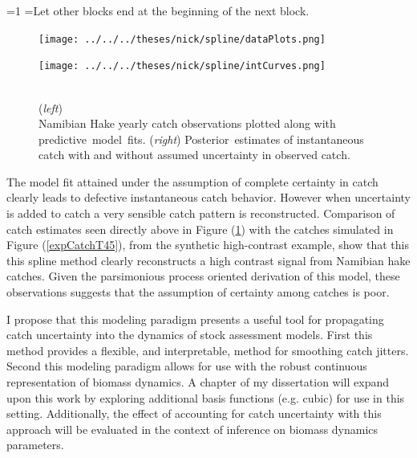 \documentclass[12pt]{article}
\newcounter{alphasect}
\def\alphainsection{0}
\newenvironment{alphasection}{%
  \ifnum\alphainsection=1%
    \errhelp={Let other blocks end at the beginning of the next block.}
    \errmessage{Nested Alpha section not allowed}
  \fi%
  \setcounter{alphasect}{0}
  \def\alphainsection{1}
}{%
  \setcounter{alphasect}{0}
  \def\alphainsection{0}
}%
\begin{document}
\begin{alphasection}
%
\clearpage
\begin{figure}[h!]
\begin{minipage}[h!]{0.36\textwidth}
%
\hspace{-1cm}
\texttt{[image: ../../../theses/nick/spline/dataPlots.png]}%
\end{minipage}
\begin{minipage}[h!]{0.36\textwidth}
\hspace{-0.5cm}
\texttt{[image: ../../../theses/nick/spline/intCurves.png]}%
\end{minipage}
\begin{minipage}[h!]{0.24\textwidth}
\caption{\label{splines}
\\(\emph{left})\\ Namibian Hake yearly catch \mbox{observations} plotted along with \mbox{predictive model fits.} (\emph{right}) \mbox{Posterior estimates} of instantaneous catch with and without assumed \mbox{uncertainty} in observed catch. 
}
\end{minipage}
\end{figure}

%
The model fit attained under the assumption of complete certainty in catch 
clearly leads to defective instantaneous catch behavior. However when 
uncertainty is added to catch a very sensible catch pattern is reconstructed.
Comparison of catch estimates seen directly above in Figure (\ref{splines}) 
with the catches simulated in Figure (\ref{expCatchT45}), from the synthetic 
high-contrast example, show that this this spline method clearly reconstructs
a high contrast signal from Namibian hake catches. Given the parsimonious 
process oriented derivation of this model, these observations suggests that the 
assumption of certainty among catches is poor.


%
I propose that this modeling paradigm presents a useful tool for propagating 
catch uncertainty into the dynamics of stock assessment models. First this 
method provides a flexible, and interpretable, method for smoothing catch 
jitters. Second this modeling paradigm allows for use with the robust 
continuous representation of biomass dynamics. A chapter of my dissertation 
will expand upon this work by exploring additional basis functions (e.g. cubic) 
for use in this setting.
Additionally, the effect of accounting for catch uncertainty with this approach 
will be evaluated in the context of inference on biomass dynamics parameters.   


\end{alphasection}
\end{document}
